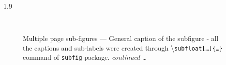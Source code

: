 \documentclass[phd]{ndsu-thesis-2022}
\newcommand\myspacing{1.9} %
\newcommand\cmd[1]{\textbackslash\texttt{#1}}  %
\begin{document}
\begin{spacing}{\myspacing}
\begin{figure}[H]
\hspace{0.5in}
\\
\captionsetup{singlelinecheck=false} %
\caption{Multiple page sub-figures --- General caption of the subfigure - all the captions and sub-labels were created through \cmd{subfloat[\ldots]\{\ldots\}} command of \texttt{subfig} package. \emph{continued} \ldots} \label{fig:1gen}
\end{figure}
\clearpage


\end{spacing}
\end{document}
